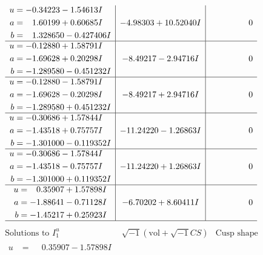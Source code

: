 \documentclass[1p]{elsarticle_modified}
\theoremstyle{definition}
\newcommand{\I}{\sqrt{-1}}
\begin{document}
$$\begin{array}{c|c|c}
\begin{aligned}
u &= -0.34223 - 1.54613 I \\
a &= \phantom{-}1.60199 + 0.60685 I \\
b &= \phantom{-}1.328650 - 0.427406 I\end{aligned}
 & -4.98303 + 10.52040 I & \phantom{-0.000000 } 0 \\ \hline\begin{aligned}
u &= -0.12880 + 1.58791 I \\
a &= -1.69628 + 0.20298 I \\
b &= -1.289580 - 0.451232 I\end{aligned}
 & -8.49217 - 2.94716 I & \phantom{-0.000000 } 0 \\ \hline\begin{aligned}
u &= -0.12880 - 1.58791 I \\
a &= -1.69628 - 0.20298 I \\
b &= -1.289580 + 0.451232 I\end{aligned}
 & -8.49217 + 2.94716 I & \phantom{-0.000000 } 0 \\ \hline\begin{aligned}
u &= -0.30686 + 1.57844 I \\
a &= -1.43518 + 0.75757 I \\
b &= -1.301000 - 0.119352 I\end{aligned}
 & -11.24220 - 1.26863 I & \phantom{-0.000000 } 0 \\ \hline\begin{aligned}
u &= -0.30686 - 1.57844 I \\
a &= -1.43518 - 0.75757 I \\
b &= -1.301000 + 0.119352 I\end{aligned}
 & -11.24220 + 1.26863 I & \phantom{-0.000000 } 0 \\ \hline\begin{aligned}
u &= \phantom{-}0.35907 + 1.57898 I \\
a &= -1.88641 - 0.71128 I \\
b &= -1.45217 + 0.25923 I\end{aligned}
 & -6.70202 + 8.60411 I & \phantom{-0.000000 } 0\\
 \hline 
 \end{array}$$\newpage$$\begin{array}{c|c|c}  
\text{Solutions to }I^u_{1}& \I (\text{vol} + \sqrt{-1}CS) & \text{Cusp shape}\\
 \hline 
\begin{aligned}
u &= \phantom{-}0.35907 - 1.57898 I \\

\end{aligned}
\end{array}$$
\end{document}
